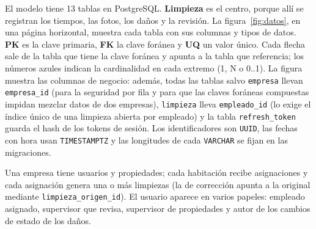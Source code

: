 \documentclass[11pt,a4paper]{article}
\begin{document}
El modelo tiene 13 tablas en PostgreSQL. \textbf{Limpieza} es el centro, porque allí se registran los tiempos, las fotos, los daños y la revisión. La figura~\ref{fig:datos}, en una página horizontal, muestra cada tabla con sus columnas y tipos de datos. \textbf{PK} es la clave primaria, \textbf{FK} la clave foránea y \textbf{UQ} un valor único. Cada flecha sale de la tabla que tiene la clave foránea y apunta a la tabla que referencia; los números azules indican la cardinalidad en cada extremo (1, N o 0..1). La figura muestra las columnas de negocio: además, todas las tablas salvo \texttt{empresa} llevan \texttt{empresa\_id} (para la seguridad por fila y para que las claves foráneas compuestas impidan mezclar datos de dos empresas), \texttt{limpieza} lleva \texttt{empleado\_id} (lo exige el índice único de una limpieza abierta por empleado) y la tabla \texttt{refresh\_token} guarda el hash de los tokens de sesión. Los identificadores son \texttt{UUID}, las fechas con hora usan \texttt{TIMESTAMPTZ} y las longitudes de cada \texttt{VARCHAR} se fijan en las migraciones.

Una empresa tiene usuarios y propiedades; cada habitación recibe asignaciones y cada asignación genera una o más limpiezas (la de corrección apunta a la original mediante \texttt{limpieza\_origen\_id}). El usuario aparece en varios papeles: empleado asignado, supervisor que revisa, supervisor de propiedades y autor de los cambios de estado de los daños.
\end{document}
